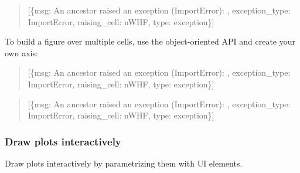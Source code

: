 \documentclass[
  letterpaper,
  DIV=11,
  numbers=noendperiod]{scrartcl}
\begin{document}
\begin{quote}
{[}\{\textquotesingle msg\textquotesingle: \textquotesingle An ancestor
raised an exception (ImportError): \textquotesingle,
\textquotesingle exception\_type\textquotesingle:
\textquotesingle ImportError\textquotesingle,
\textquotesingle raising\_cell\textquotesingle:
\textquotesingle nWHF\textquotesingle,
\textquotesingle type\textquotesingle:
\textquotesingle exception\textquotesingle\}{]}
\end{quote}

To build a figure over multiple cells, use the object-oriented API and
create your own axis:

\begin{quote}
{[}\{\textquotesingle msg\textquotesingle: \textquotesingle An ancestor
raised an exception (ImportError): \textquotesingle,
\textquotesingle exception\_type\textquotesingle:
\textquotesingle ImportError\textquotesingle,
\textquotesingle raising\_cell\textquotesingle:
\textquotesingle nWHF\textquotesingle,
\textquotesingle type\textquotesingle:
\textquotesingle exception\textquotesingle\}{]}
\end{quote}

\begin{quote}
{[}\{\textquotesingle msg\textquotesingle: \textquotesingle An ancestor
raised an exception (ImportError): \textquotesingle,
\textquotesingle exception\_type\textquotesingle:
\textquotesingle ImportError\textquotesingle,
\textquotesingle raising\_cell\textquotesingle:
\textquotesingle nWHF\textquotesingle,
\textquotesingle type\textquotesingle:
\textquotesingle exception\textquotesingle\}{]}
\end{quote}

\subsubsection{Draw plots interactively}\label{draw-plots-interactively}

Draw plots interactively by parametrizing them with UI elements.
\end{document}
